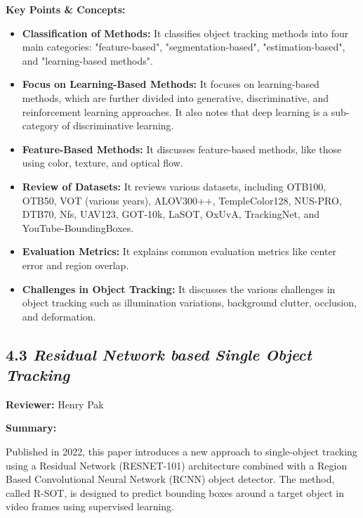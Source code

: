 \documentclass{article}
\begin{document}
\vspace{0.3cm}

\textbf{Key Points \& Concepts:}
\begin{itemize}
  \item \textbf{Classification of Methods:} It classifies object tracking methods into four main categories: "feature-based", "segmentation-based", "estimation-based", and "learning-based methods".
  \item \textbf{Focus on Learning-Based Methods:} It focuses on learning-based methods, which are further divided into generative, discriminative, and reinforcement learning approaches. It also notes that deep learning is a sub-category of discriminative learning.
  \item \textbf{Feature-Based Methods:} It discusses feature-based methods, like those using color, texture, and optical flow.
  \item \textbf{Review of Datasets:} It reviews various datasets, including OTB100, OTB50, VOT (various years), ALOV300++, TempleColor128, NUS-PRO, DTB70, Nfs, UAV123, GOT-10k, LaSOT, OxUvA, TrackingNet, and YouTube-BoundingBoxes.
  \item \textbf{Evaluation Metrics:} It explains common evaluation metrics like center error and region overlap.
  \item \textbf{Challenges in Object Tracking:} It discusses the various challenges in object tracking such as illumination variations, background clutter, occlusion, and deformation.
\end{itemize}
\subsection*{4.3 \textit{Residual Network based Single Object Tracking}}

\hspace*{\parindent}\textbf{Reviewer:} Henry Pak

\vspace{0.3cm}

\textbf{Summary:}

\vspace{0.3cm}

Published in 2022, this paper introduces a new approach to single-object tracking using a Residual Network (RESNET-101) architecture combined with a Region Based Convolutional Neural Network (RCNN) object detector. The method, called R-SOT, is designed to predict bounding boxes around a target object in video frames using supervised learning.
\end{document}
